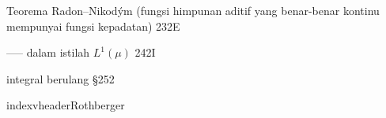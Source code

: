 Teorema Radon--Nikod\'ym (fungsi himpunan aditif yang benar-benar kontinu mempunyai fungsi kepadatan) 232E


----- dalam istilah $L^1(\mu)$ 242I





























integral berulang \S252







































indexvheader{Rothberger}




\indexmedskip































































